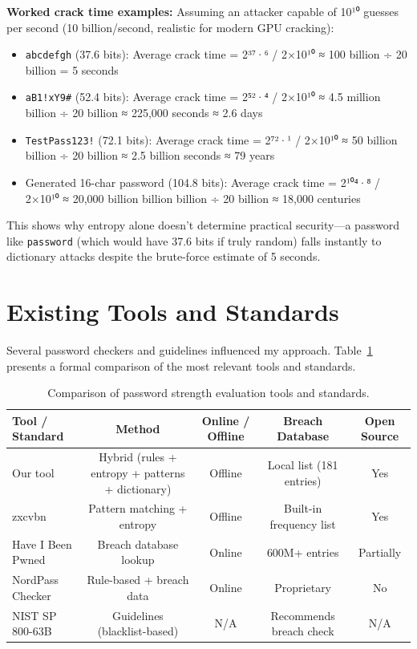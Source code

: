 \textbf{Worked crack time examples:}
Assuming an attacker capable of 10¹⁰ guesses per second (10 billion/second, realistic for modern GPU cracking):
\begin{itemize}
    \item \texttt{abcdefgh} (37.6 bits): Average crack time = 2³⁷·⁶ / 2×10¹⁰ ≈ 100 billion ÷ 20 billion = 5 seconds
    \item \texttt{aB1!xY9\#} (52.4 bits): Average crack time = 2⁵²·⁴ / 2×10¹⁰ ≈ 4.5 million billion ÷ 20 billion ≈ 225,000 seconds ≈ 2.6 days
    \item \texttt{TestPass123!} (72.1 bits): Average crack time = 2⁷²·¹ / 2×10¹⁰ ≈ 50 billion billion ÷ 20 billion ≈ 2.5 billion seconds ≈ 79 years
    \item Generated 16-char password (104.8 bits): Average crack time = 2¹⁰⁴·⁸ / 2×10¹⁰ ≈ 20,000 billion billion billion ÷ 20 billion ≈ 18,000 centuries
\end{itemize}
This shows why entropy alone doesn't determine practical security---a password like \texttt{password} (which would have 37.6 bits if truly random) falls instantly to dictionary attacks despite the brute-force estimate of 5 seconds.


\section{Existing Tools and Standards}

Several password checkers and guidelines influenced my approach. Table~\ref{tab:tools_comparison} presents a formal comparison of the most relevant tools and standards.

\begin{table}[H]
\centering
\caption{Comparison of password strength evaluation tools and standards.}
\label{tab:tools_comparison}
\begin{tabularx}{\textwidth}{lcccc}
\toprule
\textbf{Tool / Standard} & \textbf{Method} & \textbf{Online / Offline} & \textbf{Breach Database} & \textbf{Open Source} \\
\midrule
Our tool & Hybrid (rules + entropy + patterns + dictionary) & Offline & Local list (181 entries) & Yes \\
zxcvbn \cite{wheeler2016} & Pattern matching + entropy & Offline & Built-in frequency list & Yes \\
Have I Been Pwned \cite{hibp2021} & Breach database lookup & Online & 600M+ entries & Partially \\
NordPass Checker \cite{nordpass2024} & Rule-based + breach data & Online & Proprietary & No \\
NIST SP 800-63B \cite{nist2017} & Guidelines (blacklist-based) & N/A & Recommends breach check & N/A \\
\bottomrule
\end{tabularx}
\end{table}

